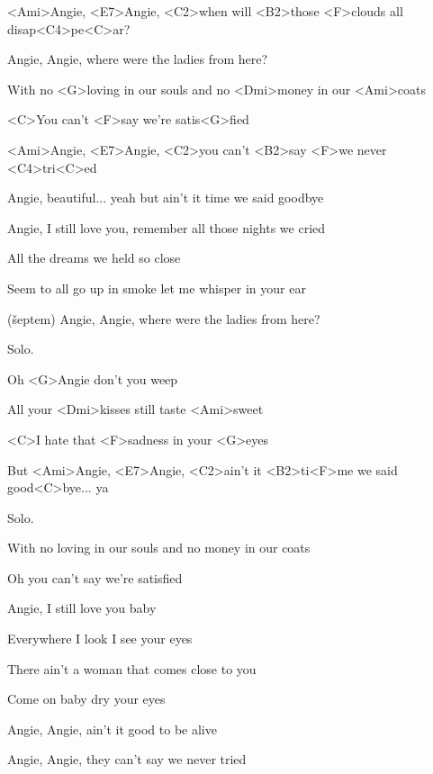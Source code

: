 

\zs
<Ami>Angie, <E7>Angie, <C2>when will <B2>those <F>clouds all disap<C4>pe<C>ar?

Angie, Angie, where were the ladies from here?
\ks

\zr
With no <G>loving in our souls and no <Dmi>money in our <Ami>coats

<C>You can't <F>say we're satis<G>fied

<Ami>Angie, <E7>Angie, <C2>you can't <B2>say <F>we never <C4>tri<C>ed
\kr

\zs
Angie, beautiful... yeah but ain't it time we said goodbye

Angie, I still love you, remember all those nights we cried
\ks

\zr
All the dreams we held so close

Seem to all go up in smoke let me whisper in your ear

(šeptem) Angie, Angie, where were the ladies from here?
\kr

Solo.

\zr
Oh <G>Angie don't you weep

All your <Dmi>kisses still taste <Ami>sweet

<C>I hate that <F>sadness in your <G>eyes

But <Ami>Angie, <E7>Angie, <C2>ain't it <B2>ti<F>me we said good<C>bye... ya
\kr

Solo.

\zr
With no loving in our souls
and no money in our coats

Oh you can't say we're satisfied
\kr

\zs
Angie, I still love you baby

Everywhere I look I see your eyes
\ks

\zs
There ain't a woman that comes close to you

Come on baby dry your eyes

Angie, Angie, ain't it good to be alive

Angie, Angie, they can't say we never tried
\ks

\kp
